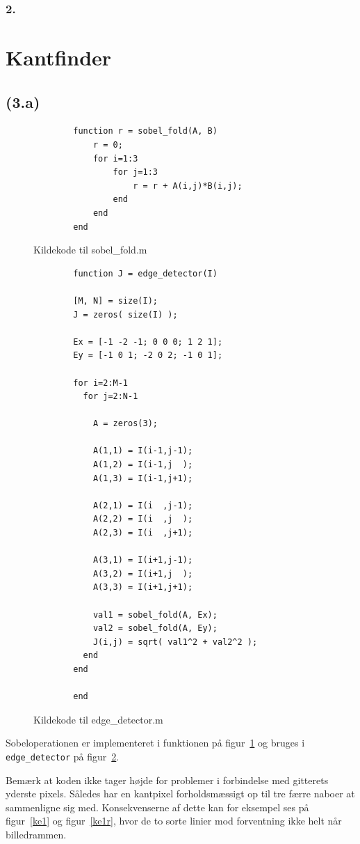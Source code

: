\documentclass{article}
\begin{document}
\subsubsection*{2.}

\section{Kantfinder}

\subsection*{(3.a)}

\begin{figure}
	\begin{verbatim}
		function r = sobel_fold(A, B)
		    r = 0;
		    for i=1:3
		        for j=1:3
		            r = r + A(i,j)*B(i,j);
		        end
		    end
		end
	\end{verbatim}
	\caption{Kildekode til sobel\_fold.m}
	\label{sobelfold}
\end{figure}

\begin{figure}
	\begin{verbatim}
		function J = edge_detector(I)

		[M, N] = size(I);
		J = zeros( size(I) );

		Ex = [-1 -2 -1; 0 0 0; 1 2 1];
		Ey = [-1 0 1; -2 0 2; -1 0 1];

		for i=2:M-1
		  for j=2:N-1

		    A = zeros(3);

		    A(1,1) = I(i-1,j-1);
		    A(1,2) = I(i-1,j  );
		    A(1,3) = I(i-1,j+1);

		    A(2,1) = I(i  ,j-1);
		    A(2,2) = I(i  ,j  );
		    A(2,3) = I(i  ,j+1);

		    A(3,1) = I(i+1,j-1);
		    A(3,2) = I(i+1,j  );
		    A(3,3) = I(i+1,j+1);

		    val1 = sobel_fold(A, Ex);
		    val2 = sobel_fold(A, Ey);
		    J(i,j) = sqrt( val1^2 + val2^2 );
		  end
		end

		end
	\end{verbatim}
	\caption{Kildekode til edge\_detector.m}
	\label{edgedetector}
\end{figure}

Sobeloperationen er implementeret i funktionen på figur~\ref{sobelfold} og bruges i {\tt edge\_detector} på figur~\ref{edgedetector}.

Bemærk at koden ikke tager højde for problemer i forbindelse med gitterets yderste pixels. Således har en kantpixel forholdsmæssigt op til tre færre naboer at sammenligne sig med. Konsekvenserne af dette kan for eksempel ses på figur~\ref{ke1} og figur~\ref{ke1r}, hvor de to sorte linier mod forventning ikke helt når billedrammen.
\end{document}

